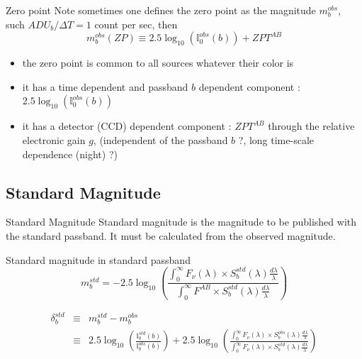 \documentclass{beamer}
\begin{document}
\begin{frame}{Zero point} 
Note sometimes one defines the zero point as the magnitude $m_b^{obs}$, such $ADU_b/\Delta T = 1$ count per sec, then
\begin{equation}
m^{obs}_b(ZP) \equiv 2.5\log_{10}\left( \mathbb{I}_0^{obs}(b)\right) + ZPT^{AB}
\end{equation}	
\begin{itemize}
\item the zero point is common to all sources whatever their color is 
\item it has a time  dependent and passband $b$ dependent component : $2.5\log_{10}\left( \mathbb{I}_0^{obs}(b)\right)$
\item it has a detector (CCD) dependent component :  $ZPT^{AB}$ through the relative electronic gain $g$, (independent of the passband $b$ ?, long time-scale dependence (night) ?)
\end{itemize}
\end{frame}



\subsection{Standard Magnitude}
\begin{frame}{Standard Magnitude} 
Standard magnitude is the magnitude to be published with the standard passband. 
It must be calculated from the observed magnitude.
\begin{alertblock}{Standard magnitude in standard passband}
	\begin{equation}
	m^{std}_b = -2.5 \log_{10}
	\left( 
	\frac{\int_0^\infty F_\nu(\lambda) \times S_b^{std}(\lambda) \frac{d\lambda}{\lambda} }{\int_0^\infty F^{AB} \times S_b^{std}(\lambda) \frac{d\lambda}{\lambda}} 
	\right)
	\end{equation}	
\end{alertblock}	

\begin{eqnarray}
\delta^{std}_b & \equiv & m_b^{std} - m_b^{obs} \\
& \equiv & 2.5 \log_{10}\left( \frac{\mathbb{I}_0^{std}(b)}{\mathbb{I}_0^{obs}(b)}\right) 
+ 2.5 \log_{10} 
	\left( 
	\frac{\int_0^\infty F_\nu(\lambda) \times S_b^{obs}(\lambda) \frac{d\lambda}{\lambda} }{\int_0^\infty F_\nu(\lambda) \times S_b^{std}(\lambda) \frac{d\lambda}{\lambda}} 
	\right)
\end{eqnarray} 
\end{frame}
\end{document}
